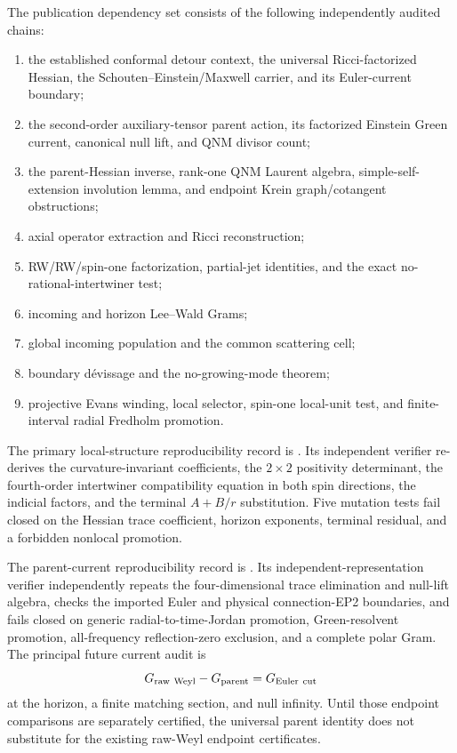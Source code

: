 \documentclass[11pt]{article}
\begin{document}
The publication dependency set consists of the following independently
audited chains:
\begin{enumerate}
\item the established conformal detour context, the universal
Ricci-factorized Hessian, the Schouten--Einstein/Maxwell carrier, and its
Euler-current boundary;
\item the second-order auxiliary-tensor parent action, its factorized
Einstein Green current, canonical null lift, and QNM divisor count;
\item the parent-Hessian inverse, rank-one QNM Laurent algebra,
simple-self-extension involution lemma, and endpoint Krein graph/cotangent
obstructions;
\item axial operator extraction and Ricci reconstruction;
\item RW/RW/spin-one factorization, partial-jet identities, and the exact
no-rational-intertwiner test;
\item incoming and horizon Lee--Wald Grams;
\item global incoming population and the common scattering cell;
\item boundary d\'evissage and the no-growing-mode theorem;
\item projective Evans winding, local selector, spin-one local-unit test,
and finite-interval radial Fredholm promotion.
\end{enumerate}

The primary local-structure reproducibility record is
.
Its independent verifier re-derives the curvature-invariant coefficients,
the \(2\times2\) positivity determinant, the fourth-order intertwiner
compatibility equation in both spin directions, the indicial factors, and
the terminal \(A+B/r\) substitution.  Five mutation tests fail closed on
the Hessian trace coefficient, horizon exponents, terminal residual, and a
forbidden nonlocal promotion.

The parent-current reproducibility record is
.  Its
independent-representation verifier
independently repeats the four-dimensional trace elimination and null-lift
algebra, checks the imported Euler and physical connection-EP2 boundaries,
and fails closed on generic radial-to-time-Jordan promotion,
Green-resolvent promotion, all-frequency reflection-zero exclusion, and a
complete polar Gram.  The principal future current audit is
\[
G_{\rm raw\ Weyl}-G_{\rm parent}=G_{\rm Euler\ cut}
\]
at the horizon, a finite matching section, and null infinity.  Until those
endpoint comparisons are separately certified, the universal parent
identity does not substitute for the existing raw-Weyl endpoint
certificates.
\end{document}
